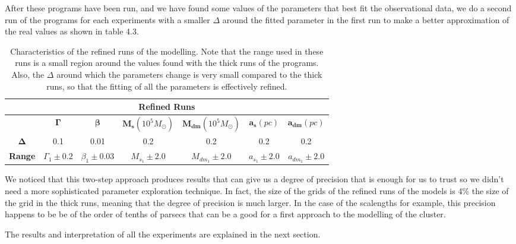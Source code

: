 After these programs have been run, and we have found some values of the parameters that best fit the observational data, we do a second run of the programs for each experiments with a smaller $\Delta$ around the fitted parameter in the first run to make a better approximation of the real values as shown in table 4.3.

\begin{table}[H]
\centering
\label{my-label}
\begin{tabular}{|c|c|c|c|c|c|c|}
\hline
\multicolumn{7}{|c|}{\textbf{Refined Runs}}                                                                          \\ \hline
               & \textbf{$\mathbf{\Gamma}$} & \textbf{$\mathbf{\beta}$} & \textbf{$\mathbf{M_{s}}(10^{5} M_{\odot})$} & \textbf{$\mathbf{M_{dm}}(10^{5} M_{\odot})$} & \textbf{$\mathbf{a_{s}}(pc)$} & \textbf{$\mathbf{a_{dm}}(pc)$} \\ \hline
\textbf{$\mathbf{\Delta}$}  &  0.1 &  0.01     &  0.2    &  0.2   &  0.2    &  0.2          \\ \hline
\textbf{Range} & $\Gamma_{1}\pm 0.2$   & $\beta_{1}\pm 0.03$        & $M_{s}_{1}\pm 2.0$      & $M_{dm}_{1}\pm 2.0$   & $a_{s}_{1}\pm 2.0$      & $a_{dm}_{1}\pm 2.0$            \\ \hline
\end{tabular}
\caption[Characteristics of the refined runs of the modelling]{Characteristics of the refined runs of the modelling. Note that the range used in these runs is a small region around the values found with the thick runs of the programs. Also, the $\Delta$ around which the parameters change is very small compared to the thick runs, so that the fitting of all the parameters is effectively refined.}
\end{table}

We noticed that this two-step approach produces results that can give us a degree of precision that is enough for us to trust so we didn't need a more sophisticated parameter exploration technique. In fact, the size of the grids of the refined runs of the models is 4\% the size of the grid in the thick runs, meaning that the degree of precision is much larger. In the case of the scalengths for example, this precision happens to be be of the order of tenths of parsecs that can be a good for a first approach to the modelling of the cluster.

The results and interpretation of all the experiments are explained in the next section.

